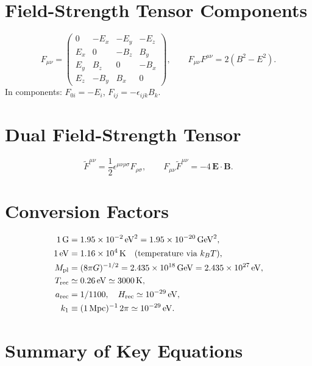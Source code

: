 \documentclass[12pt,a4paper,openany]{book}
\newcommand{\Mpl}{M_{\rm pl}}
\begin{document}
\section{Field-Strength Tensor Components}

\begin{equation}
  F_{\mu\nu} = \begin{pmatrix} 0 & -E_x & -E_y & -E_z \\ E_x & 0 & -B_z & B_y \\ E_y & B_z & 0 & -B_x \\ E_z & -B_y & B_x & 0 \end{pmatrix}, \qquad F_{\mu\nu}F^{\mu\nu} = 2(B^2 - E^2).
\end{equation}
In components: $F_{0i} = -E_i$, $F_{ij} = -\epsilon_{ijk}B_k$.

\section{Dual Field-Strength Tensor}

\begin{equation}
  \tilde{F}^{\mu\nu} = \frac{1}{2}\epsilon^{\mu\nu\rho\sigma}F_{\rho\sigma}, \qquad F_{\mu\nu}\tilde{F}^{\mu\nu} = -4\,\mathbf{E}\cdot\mathbf{B}.
\end{equation}

\section{Conversion Factors}

\begin{align}
  1\,\mathrm{G} &= 1.95\times10^{-2}\,\mathrm{eV}^2 = 1.95\times10^{-20}\,\mathrm{GeV}^2, \\
  1\,\mathrm{eV} &= 1.16\times10^4\,\mathrm{K} \quad (\text{temperature via }k_B T), \\
  \Mpl &= (8\pi G)^{-1/2} = 2.435\times10^{18}\,\mathrm{GeV} = 2.435\times10^{27}\,\mathrm{eV}, \\
  T_{\rm rec} &\simeq 0.26\,\mathrm{eV} \simeq 3000\,\mathrm{K}, \\
  a_{\rm rec} &= 1/1100, \quad H_{\rm rec} \simeq 10^{-29}\,\mathrm{eV}, \\
  k_1 &\equiv (1\,\mathrm{Mpc})^{-1}\,2\pi \simeq 10^{-29}\,\mathrm{eV}.
\end{align}

\section{Summary of Key Equations}
\end{document}
